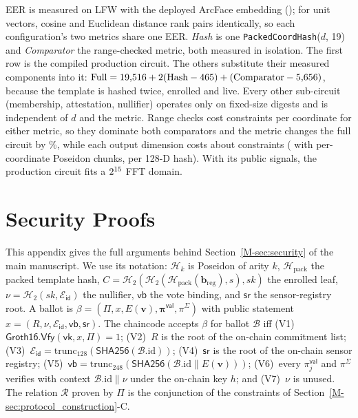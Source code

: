 \documentclass[10pt,letterpaper,journal]{IEEEtran}
\begin{document}
EER is measured on LFW with the deployed ArcFace embedding (); for unit vectors, cosine and Euclidean distance rank pairs identically, so each configuration's two metrics share one EER. \emph{Hash} is one \texttt{PackedCoordHash}($d$, 19) and \emph{Comparator} the range-checked metric, both measured in isolation. The first row is the compiled production circuit. The others substitute their measured components into it: $\text{Full} = 19{,}516 + 2(\text{Hash} - 465) + (\text{Comparator} - 5{,}656)$, because the template is hashed twice, enrolled and live. Every other sub-circuit (membership, attestation, nullifier) operates only on fixed-size digests and is independent of $d$ and the metric. Range checks cost \nRangePerCoord{} constraints per coordinate for either metric, so they dominate both comparators and the metric changes the full circuit by \nEuclidSaveShare\%, while each output dimension costs about \nPerDim{} constraints (\nChunkedPerDim{} with per-coordinate Poseidon chunks, \nChunkedHash{} per 128-D hash). With its public signals, the production circuit fits a $2^{15}$ FFT domain.

\section{Security Proofs}
\label{sec:supp-security-proofs}

This appendix gives the full arguments behind Section~\ref{M-sec:security} of the main manuscript. We use its notation: $\mathcal{H}_k$ is Poseidon of arity $k$, $\mathcal{H}_{\text{pack}}$ the packed template hash, $C = \mathcal{H}_2(\mathcal{H}_2(\mathcal{H}_{\text{pack}}(\mathbf{b}_{\text{reg}}), s), sk)$ the enrolled leaf, $\nu = \mathcal{H}_2(sk, \mathcal{E}_{\mathsf{id}})$ the nullifier, $\mathsf{vb}$ the vote binding, and $\mathsf{sr}$ the sensor-registry root. A ballot is $\beta = (\Pi, x, E(\mathbf{v}), \boldsymbol{\pi}^{\mathsf{val}}, \pi^{\Sigma})$ with public statement $x = (R, \nu, \mathcal{E}_{\mathsf{id}}, \mathsf{vb}, \mathsf{sr})$. The chaincode accepts $\beta$ for ballot $\mathcal{B}$ iff (V1)~$\mathsf{Groth16.Vfy}(\mathsf{vk}, x, \Pi) = 1$; (V2)~$R$ is the root of the on-chain commitment list; (V3)~$\mathcal{E}_{\mathsf{id}} = \mathrm{trunc}_{128}(\mathsf{SHA256}(\mathcal{B}.\mathrm{id}))$; (V4)~$\mathsf{sr}$ is the root of the on-chain sensor registry; (V5)~$\mathsf{vb} = \mathrm{trunc}_{248}(\mathsf{SHA256}(\mathcal{B}.\mathrm{id} \| E(\mathbf{v})))$; (V6)~every $\pi^{\mathsf{val}}_j$ and $\pi^{\Sigma}$ verifies with context $\mathcal{B}.\mathrm{id}\|\nu$ under the on-chain key $h$; and (V7)~$\nu$ is unused. The relation $\mathcal{R}$ proven by $\Pi$ is the conjunction of the constraints of Section~\ref{M-sec:protocol_construction}-C.
\end{document}
